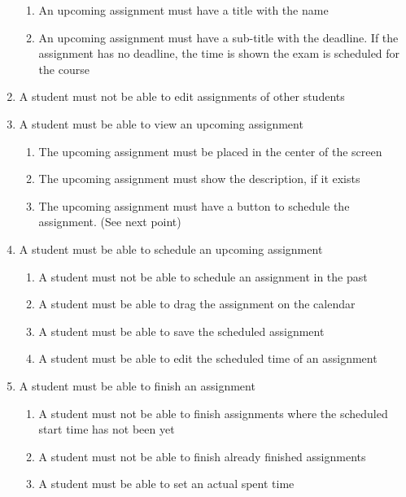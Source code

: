 \begin{enumerate}
\begin{enumerate}
      \item An upcoming assignment must have a title with the name

      \item An upcoming assignment must have a sub-title with the deadline.
        If the assignment has no deadline, the time is shown the exam is
        scheduled for the course
    \end{enumerate}

  \item A student must not be able to edit assignments of other students

  \item A student must be able to view an upcoming assignment
    \begin{enumerate}
      \item The upcoming assignment must be placed in the center of the screen

      \item The upcoming assignment must show the description, if it exists

      \item The upcoming assignment must have a button to schedule the assignment.
        (See next point)
    \end{enumerate}

  \item A student must be able to schedule an upcoming assignment
    \begin{enumerate}
      \item A student must not be able to schedule an assignment in the past

      \item A student must be able to drag the assignment on the calendar

      \item A student must be able to save the scheduled assignment

      \item A student must be able to edit the scheduled time of an assignment
    \end{enumerate}

  \item A student must be able to finish an assignment
    \begin{enumerate}
      \item A student must not be able to finish assignments where the scheduled
        start time has not been yet

      \item A student must not be able to finish already finished assignments

      \item A student must be able to set an actual spent time
    \end{enumerate}

\end{enumerate}


